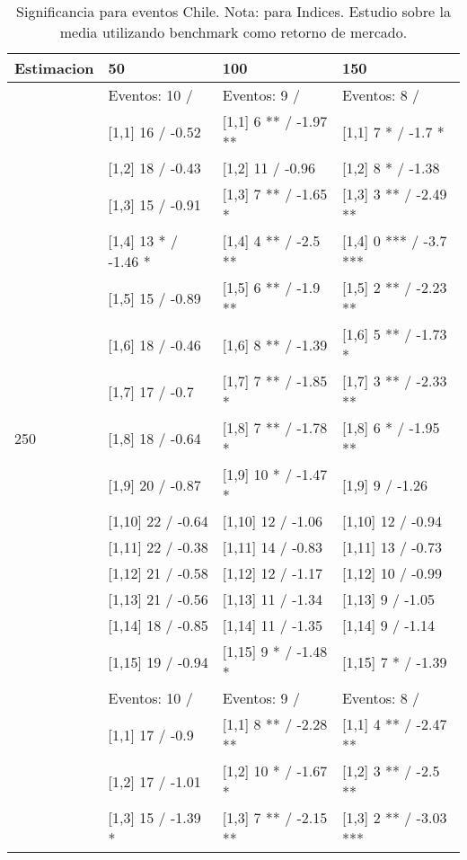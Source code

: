 \begin{table}

\caption{Significancia para eventos Chile. Nota: para Indices. Estudio sobre la media utilizando benchmark como retorno de mercado.}
\centering
\begin{tabular}[t]{llll}
\toprule
Estimacion & 50 & 100 & 150\\
\midrule
 & Eventos:  10 / & Eventos:  9 / & Eventos:  8 /\\
 & {}[1,1] 16  / -0.52 & {}[1,1] 6 ** / -1.97 ** & {}[1,1] 7 * / -1.7 *\\
 & {}[1,2] 18  / -0.43 & {}[1,2] 11  / -0.96 & {}[1,2] 8 * / -1.38\\
 & {}[1,3] 15  / -0.91 & {}[1,3] 7 ** / -1.65 * & {}[1,3] 3 ** / -2.49 **\\
 & {}[1,4] 13 * / -1.46 * & {}[1,4] 4 ** / -2.5 ** & {}[1,4] 0 *** / -3.7 ***\\
\addlinespace
 & {}[1,5] 15  / -0.89 & {}[1,5] 6 ** / -1.9 ** & {}[1,5] 2 ** / -2.23 **\\
 & {}[1,6] 18  / -0.46 & {}[1,6] 8 ** / -1.39 & {}[1,6] 5 ** / -1.73 *\\
 & {}[1,7] 17  / -0.7 & {}[1,7] 7 ** / -1.85 * & {}[1,7] 3 ** / -2.33 **\\
250 & {}[1,8] 18  / -0.64 & {}[1,8] 7 ** / -1.78 * & {}[1,8] 6 * / -1.95 **\\
 & {}[1,9] 20  / -0.87 & {}[1,9] 10 * / -1.47 * & {}[1,9] 9  / -1.26\\
\addlinespace
 & {}[1,10] 22  / -0.64 & {}[1,10] 12  / -1.06 & {}[1,10] 12  / -0.94\\
 & {}[1,11] 22  / -0.38 & {}[1,11] 14  / -0.83 & {}[1,11] 13  / -0.73\\
 & {}[1,12] 21  / -0.58 & {}[1,12] 12  / -1.17 & {}[1,12] 10  / -0.99\\
 & {}[1,13] 21  / -0.56 & {}[1,13] 11  / -1.34 & {}[1,13] 9  / -1.05\\
 & {}[1,14] 18  / -0.85 & {}[1,14] 11  / -1.35 & {}[1,14] 9  / -1.14\\
\addlinespace
 & {}[1,15] 19  / -0.94 & {}[1,15] 9 * / -1.48 * & {}[1,15] 7 * / -1.39\\
 & Eventos:  10 / & Eventos:  9 / & Eventos:  8 /\\
 & {}[1,1] 17  / -0.9 & {}[1,1] 8 ** / -2.28 ** & {}[1,1] 4 ** / -2.47 **\\
 & {}[1,2] 17  / -1.01 & {}[1,2] 10 * / -1.67 * & {}[1,2] 3 ** / -2.5 **\\
 & {}[1,3] 15  / -1.39 * & {}[1,3] 7 ** / -2.15 ** & {}[1,3] 2 ** / -3.03 ***\\

\end{tabular}
\end{table}
